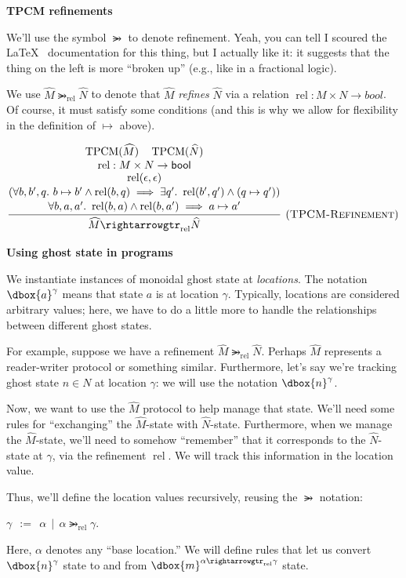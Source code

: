 \documentclass{article}
\newcommand{\einfer}[3]
        {\infer[(\textsc{#1})]{#3}{#2}}
\newcommand{\stacktwo}[2]{\stackanchor{\ensuremath{#1}}{\ensuremath{#2}}}
\newcommand{\stackthree}[3]{\stackanchor{\stacktwo{#1}{#2}}{\ensuremath{#3}}}
\newcommand{\stackfour}[4]{\stackanchor{\stackthree{#1}{#2}{#3}}{\ensuremath{#4}}}
\newcommand{\stackfive}[5]{\stackanchor{\stackfour{#1}{#2}{#3}{#4}}{\ensuremath{#5}}}
\newcommand\dboxed[1]{\dbox{\vphantom{t}\ensuremath{#1}}}
\newcommand{\unit}{\epsilon}
\newcommand{\bool}{\textsf{bool}}
\DeclareMathOperator{\rel}{rel}
\DeclareMathOperator{\TPCM}{TPCM}
\newcommand{\refines}{\rightarrowgtr}
\begin{document}
\textbf{TPCM refinements}

We'll use the symbol $\refines$ to denote refinement. Yeah, you can tell I scoured the \LaTeX~ documentation for this thing, but I actually like it: it suggests that the thing on the left is more ``broken up'' (e.g., like in a fractional logic).

We use $\widehat{M} \refines_{\rel} \widehat{N}$ to denote that $\widehat{M}$ \emph{refines} $\widehat{N}$ via a relation $\rel : M \times N \to bool$. Of course, it must satisfy some conditions 
(and this is why we allow for flexibility in the definition of $\mapsto$ above).

\[
  \einfer{TPCM-Refinement}{
    \stackfive{
      \TPCM(\widehat{M}) \quad \TPCM(\widehat{N})
    }{
      \rel : M \times N \to \bool
    }{
      \rel(\unit, \unit)
    }{
       (\forall b, b', q .~ b \mapsto b' \land \rel(b, q) \implies \exists q' .~ \rel(b', q') \land (q \mapsto q'))
    }{
      \forall b, a, a' .~ \rel(b,a) \land \rel(b,a') \implies a \mapsto a'
    }
  }{
    \widehat{M} \refines_{\rel} \widehat{N}
  }
\]

\textbf{Using ghost state in programs}

We instantiate instances of monoidal ghost state at \emph{locations}.
The notation $\dboxed{a}^\gamma$ means that state $a$ is at location $\gamma$.
Typically, locations are considered arbitrary values; here, we have to do a little
more to handle the relationships between different ghost states.

For example, suppose we have a refinement $\widehat{M} \refines_{\rel} \widehat{N}$.
Perhaps $\widehat{M}$ represents a reader-writer protocol or something similar.
Furthermore, let's say we're tracking ghost state $n \in N$ at location $\gamma$:
we will use the notation $\dboxed{n}^\gamma$.

Now, we want to use the $\widehat{M}$ protocol to help manage that state.
We'll need some rules for ``exchanging'' the $\widehat{M}$-state with $\widehat{N}$-state.
Furthermore, when we manage the $\widehat{M}$-state, we'll need to somehow ``remember''
that it corresponds to the $\widehat{N}$-state at $\gamma$, via the refinement $\rel$.
We will track this information in the location value.

Thus, we'll define the location values recursively, reusing the $\refines$ notation:

$\gamma ~~:=~~ \alpha ~~|~~ \alpha \refines_{\rel} \gamma$.

Here, $\alpha$ denotes any ``base location.'' We will define rules that let us
convert $\dboxed{n}^\gamma$ state to and from $\dboxed{m}^{\alpha \refines_{\rel} \gamma}$
state.
\end{document}
